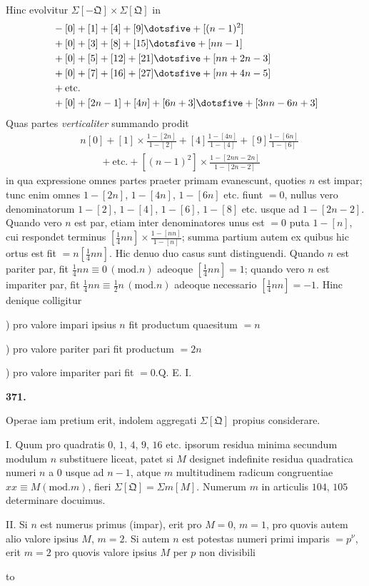 Hinc evolvitur $\Sigma[-\mathfrak{Q}]\times\Sigma[\mathfrak{Q}]$ in
\[
\begin{aligned}
&-[0]+[1]+[4]+[9]\dotsfive+[(n-1)^2]\\
&+[0]+[3]+[8]+[15]\dotsfive+[nn-1]\\
&+[0]+[5]+[12]+[21]\dotsfive+[nn+2n-3]\\
&+[0]+[7]+[16]+[27]\dotsfive+[nn+4n-5]\\
&+\text{etc.}\\
&+[0]+[2n-1]+[4n]+[6n+3]\dotsfive+[3nn-6n+3]
\end{aligned}
\]
Quas partes \textit{verticaliter} summando prodit
\[
\begin{aligned}
&n[0]+[1]\times\frac{1-[2n]}{1-[2]}+[4]\frac{1-[4n]}{1-[4]}+[9]\frac{1-[6n]}{1-[6]}\\
&\qquad+\text{etc.}+[(n-1)^2]\times\frac{1-[2nn-2n]}{1-[2n-2]}
\end{aligned}
\]
in qua expressione omnes partes praeter primam evanescunt, quoties $n$ est impar; tunc enim omnes $1-[2n]$, $1-[4n]$, $1-[6n]$ etc. fiunt $=0$, nullus vero denominatorum $1-[2]$, $1-[4]$, $1-[6]$, $1-[8]$ etc. usque ad $1-[2n-2]$. Quando vero $n$ est par, etiam inter denominatores unus est $=0$ puta $1-[n]$, cui respondet terminus $[\frac14nn]\times\frac{1-[nn]}{1-[n]}$; summa partium autem ex quibus hic ortus est fit $=n[\frac14nn]$. Hic denuo duo casus sunt distinguendi. Quando $n$ est pariter par, fit $\frac14nn\equiv0\, (\mathrm{mod}.n)$ adeoque $[\frac14nn]=1$; quando vero $n$ est impariter par, fit $\frac14nn\equiv\frac12n\, (\mathrm{mod}.n)$ adeoque necessario $[\frac14nn]=-1$. Hinc denique colligitur
\par{}) pro valore impari ipsius $n$ fit productum quaesitum $=n$
\par{}) pro valore pariter pari fit productum $=2n$
\par{}) pro valore impariter pari fit $=0$.\quad Q. E. I.
\par\medskip{}\centerline{\textbf{371.}}\nobreak\smallskip
Operae iam pretium erit, indolem aggregati $\Sigma[\mathfrak{Q}]$ propius considerare.
\par I. Quum pro quadratis $0$, $1$, $4$, $9$, $16$ etc. ipsorum residua minima secundum modulum $n$ substituere liceat, patet si $M$ designet indefinite residua quadratica numeri $n$ a $0$ usque ad $n-1$, atque $m$ multitudinem radicum congruentiae $xx\equiv M(\mathrm{mod}.m)$, fieri $\Sigma[\mathfrak{Q}]=\Sigma m[M]$. Numerum $m$ in articulis $104$, $105$ determinare docuimus.
\par II. Si $n$ est numerus primus (impar), erit pro $M=0$, $m=1$, pro quovis autem alio valore ipsius $M$, $m=2$. Si autem $n$ est potestas numeri primi imparis $=p^\nu$, erit $m=2$ pro quovis valore ipsius $M$ per $p$ non divisibili\quad\textemdash
\par\nobreak\noindent\hbox to\linewidth{\textemdash\hfil\textemdash\hfil\textemdash\hfil\textemdash\hfil\textemdash\hfil\textemdash\hfil\textemdash\hfil\textemdash\hfil\textemdash\hfil\textemdash\hfil\textemdash\hfil\textemdash\hfil\textemdash\hfil\textemdash\hfil\textemdash\hfil\textemdash\hfil\textemdash}\par
